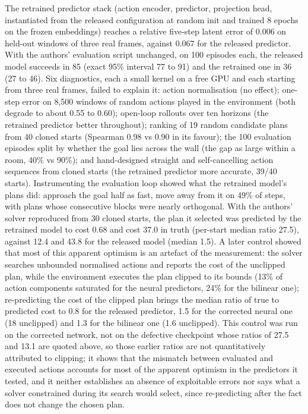 \documentclass[11pt,a4paper]{article}
\begin{document}
The retrained predictor stack (action encoder, predictor, projection head, instantiated from the released configuration at random init and trained 8 epochs on the frozen embeddings) reaches a relative five-step latent error of 0.006 on held-out windows of three real frames, against 0.067 for the released predictor. With the authors' evaluation script unchanged, on 100 episodes each, the released model succeeds in 85 (exact 95\% interval 77 to 91) and the retrained one in 36 (27 to 46). Six diagnostics, each a small kernel on a free GPU and each starting from three real frames, failed to explain it: action normalisation (no effect); one-step error on 8,500 windows of random actions played in the environment (both degrade to about 0.55 to 0.60); open-loop rollouts over ten horizons (the retrained predictor better throughout); ranking of 19 random candidate plans from 40 cloned starts (Spearman 0.98 vs 0.90 in its favour); the 100 evaluation episodes split by whether the goal lies across the wall (the gap as large within a room, 40\% vs 90\%); and hand-designed straight and self-cancelling action sequences from cloned starts (the retrained predictor more accurate, 39/40 starts). Instrumenting the evaluation loop showed what the retrained model's plans did: approach the goal half as fast, move away from it on 49\% of steps, with plans whose consecutive blocks were nearly orthogonal. With the authors' solver reproduced from 30 cloned starts, the plan it selected was predicted by the retrained model to cost 0.68 and cost 37.0 in truth (per-start median ratio 27.5), against 12.4 and 43.8 for the released model (median 1.5). A later control showed that most of this apparent optimism is an artefact of the measurement: the solver searches unbounded normalised actions and reports the cost of the unclipped plan, while the environment executes the plan clipped to its bounds (13\% of action components saturated for the neural predictors, 24\% for the bilinear one); re-predicting the cost of the clipped plan brings the median ratio of true to predicted cost to 0.8 for the released predictor, 1.5 for the corrected neural one (18 unclipped) and 1.3 for the bilinear one (1.6 unclipped). This control was run on the corrected network, not on the defective checkpoint whose ratios of 27.5 and 13.1 are quoted above, so those earlier ratios are not quantitatively attributed to clipping; it shows that the mismatch between evaluated and executed actions accounts for most of the apparent optimism in the predictors it tested, and it neither establishes an absence of exploitable errors nor says what a solver constrained during its search would select, since re-predicting after the fact does not change the chosen plan.
\end{document}
